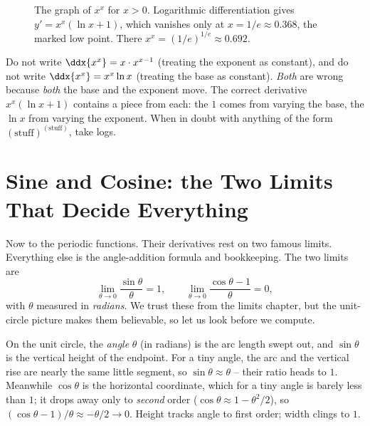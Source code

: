 \begin{figure}[H]
\centering
{}
\caption{The graph of $x^x$ for $x>0$. Logarithmic differentiation gives
$y' = x^x(\ln x+1)$, which vanishes only at $x=1/e\approx 0.368$, the marked
low point. There $x^x = (1/e)^{1/e}\approx 0.692$.}
\label{ch12:fig-xtox}
\end{figure}

\begin{trapbox}
Do not write $\ddx{x^x} = x\cdot x^{x-1}$ (treating the exponent as
constant), and do not write $\ddx{x^x} = x^x\ln x$ (treating the base as
constant). \emph{Both} are wrong because \emph{both} the base and the
exponent move. The correct derivative $x^x(\ln x+1)$ contains a piece from
each: the $1$ comes from varying the base, the $\ln x$ from varying the
exponent. When in doubt with anything of the form
$(\text{stuff})^{(\text{stuff})}$, take logs.
\end{trapbox}

\section{Sine and Cosine: the Two Limits That Decide Everything}
\label{ch12:trig}

Now to the periodic functions. Their derivatives rest on two famous limits.
Everything else is the angle-addition formula and bookkeeping. The two
limits are
\[
   \lim_{\theta\to 0}\frac{\sin\theta}{\theta} = 1,
   \qquad
   \lim_{\theta\to 0}\frac{\cos\theta - 1}{\theta} = 0,
\]
with $\theta$ measured in \emph{radians}. We trust these from the limits
chapter, but the unit-circle picture makes them believable, so let us look
before we compute.

\begin{intuitionbox}
On the unit circle, the \emph{angle} $\theta$ (in radians) is the arc length
swept out, and $\sin\theta$ is the vertical height of the endpoint. For a
tiny angle, the arc and the vertical rise are nearly the same little
segment, so $\sin\theta \approx \theta$ -- their ratio heads to $1$.
Meanwhile $\cos\theta$ is the horizontal coordinate, which for a tiny angle
is barely less than $1$; it drops away only to \emph{second} order
($\cos\theta\approx 1-\theta^2/2$), so $(\cos\theta-1)/\theta\approx
-\theta/2\to 0$. Height tracks angle to first order; width clings to $1$.
\end{intuitionbox}

